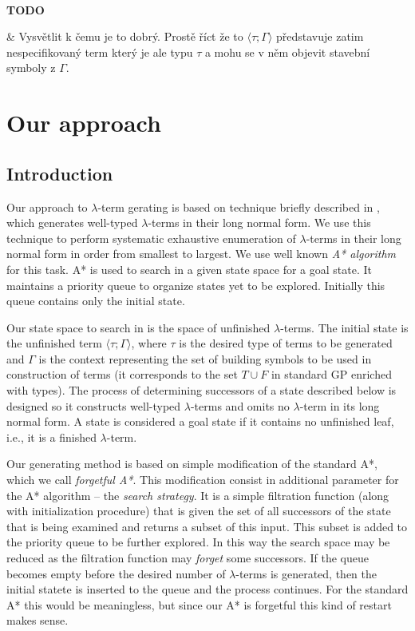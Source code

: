 \documentclass{llncs}
\newcommand{\lterm}{$\lambda$-term\xspace}
\newcommand{\lterms}{$\lambda$-terms\xspace}
\newenvironment{todo}
{~\\ {\color{red}\textbf{TODO}}
  \begin{easylist}[itemize]}
{ \end{easylist}}
\newcommand{\ul}[2]{\langle #1 ; #2 \rangle}
\newcommand{\tom}[1]{{\color{ForestGreen} #1}}
\begin{document}
\begin{todo}
   & Vysvětlit k čemu je to dobrý. Prostě říct že 
     to $\ul{\tau}{\Gamma}$ představuje zatim nespecifikovaný term
     který je ale typu $\tau$ a mohu se v něm objevit stavební symboly
     z $\Gamma$.
\end{todo}


\section{Our approach}
\label{approach}
\subsection{Introduction}
\tom{
Our approach to \lterm gerating is based on technique 
briefly described in \cite{barendregt10}, which generates
well-typed \lterms in their long normal form. 
We use this technique to perform systematic exhaustive enumeration
of \lterms in their long normal form in order from smallest to largest.
We use well known \textit{A* algorithm} \cite{AIMA} for this task.
A* is used to search in a given state space for a goal state. 
It maintains a priority queue to organize states yet to be explored.
Initially this queue contains only the initial state.  

Our state space to search in is the space of unfinished \lterms. 
The initial state is the unfinished term $\ul{\tau}{\Gamma}$, 
where $\tau$ is the desired type of
terms to be generated and $\Gamma$ is the context
representing the set of building symbols to be used in construction of
terms (it corresponds to the set $T \cup F$ in
standard GP enriched with types). The process of determining 
successors of a state described below is designed so it constructs well-typed 
\lterms and omits no \lterm in its long normal form. 
A state is considered a goal state if it contains no unfinished
leaf, i.e., it is a finished \lterm.

Our generating method is based on simple modification of the
standard A*, which we call \textit{forgetful A*}. This modification consist in 
additional parameter for the A* algorithm -- the \textit{search strategy}. 
It is a simple filtration function (along with initialization procedure)
that is given the set of all successors of the state that is being examined
and returns a subset of this input. This subset is added to the priority queue 
to be further explored. In this way the search space may be reduced as 
the filtration function may \textit{forget} some successors.
If the queue becomes empty before the desired number of \lterms
is generated, then the initial statete is inserted to the queue
and the process continues. For the standard A* this would be meaningless,
but since our A* is forgetful this kind of restart makes sense.

}
\end{document}
